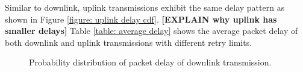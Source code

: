 \documentclass{article}
\begin{document}
Similar to downlink, uplink transmissions exhibit the same delay pattern as shown in Figure \ref{figure: uplink delay cdf}. {\bf [EXPLAIN why uplink has smaller delays]}
Table \ref{table: average delay} shows the average packet delay of both downlink and uplink transmissions with different retry limits.  

\begin{figure}[htbp]
\centering
{}
\caption{Probability distribution of packet delay of downlink transmission.}
\label{figure: downlink delay cdf}
\end{figure}
\end{document}
